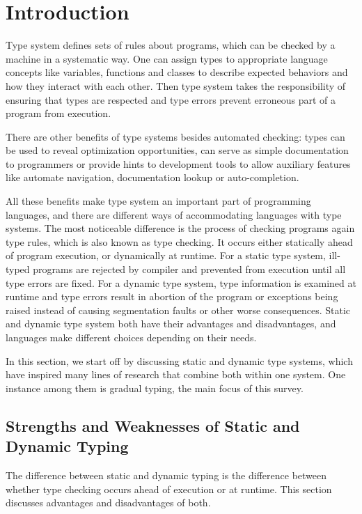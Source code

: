 \section{Introduction}

Type system defines sets of rules about programs, which can be checked by a machine
in a systematic way.
One can assign types to appropriate language concepts like
variables, functions and classes to describe expected behaviors
and how they interact with each other.
Then type system takes the responsibility of ensuring that types are respected and
type errors prevent erroneous part of a program from execution.

There are other benefits of type systems besides automated checking:
types can be used to reveal optimization opportunities,
can serve as simple documentation to programmers or
provide hints to development tools to allow auxiliary features like
automate navigation, documentation lookup
or auto-completion.

All these benefits make type system an important part of programming languages,
and there are different ways of accommodating languages with type systems.
The most noticeable difference is the process of checking programs again type rules,
which is also known as type checking.
It occurs either statically ahead of program execution, or dynamically at runtime.
For a static type system, ill-typed programs are rejected by compiler and
prevented from execution until all type errors are fixed.
For a dynamic type system,
type information is examined at runtime and type errors result
in abortion of the program or exceptions being raised
instead of causing segmentation faults or other worse consequences.
Static and dynamic type system both have their advantages and disadvantages,
and languages make different choices depending on their needs.

In this section, we start off by discussing static and dynamic type systems,
which have inspired many lines of research that combine both within one system.
One instance among them is gradual typing, the main focus of this survey.

\subsection{Strengths and Weaknesses of Static and Dynamic Typing}

The difference between static and dynamic typing is the difference
between whether type checking occurs ahead of execution or at runtime.
This section discusses advantages and disadvantages of both.

